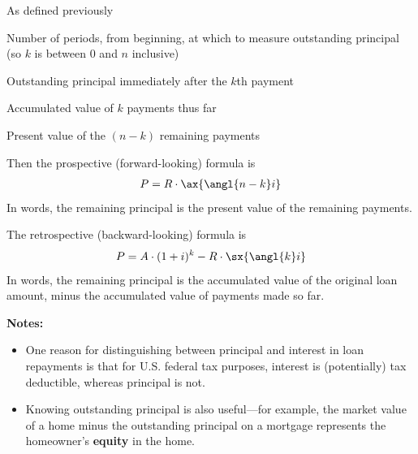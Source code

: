 \documentclass[14pt,twoside]{extarticle}
\begin{document}
\begin{description}[align=right,labelwidth=3.5cm,leftmargin=!,font=\bfseries]
  \item[n, R, i, A] As defined previously
  \item[k] Number of periods, from beginning, at which to measure outstanding principal (so $k$ is between 0 and $n$ inclusive)
  \item[P] Outstanding principal immediately after the $k$th payment
  \item[$R \cdot \mathbf{\sx{\angl{k} i}}$] Accumulated value of $k$ payments thus far
  \item[$R \cdot \mathbf{\ax{\angl{n-k} i}}$] Present value of the $(n-k)$ remaining payments
\end{description}

\pagebreak

Then the prospective (forward-looking) formula is
\begin{align*}
  P & = R \cdot \ax{ \angl{n-k} i} \\
\end{align*}
In words, the remaining principal is the present value of the remaining payments.

The retrospective (backward-looking) formula is
\begin{align*}
  P & = A \cdot (1+i)^k - R \cdot \sx{ \angl{k} i} \\
\end{align*}
In words, the remaining principal is the accumulated value of the original loan
amount, minus the accumulated value of payments made so far.

\vspace{.2in}
\textbf{Notes:}

\begin{itemize}
  \item One reason for distinguishing between principal and interest in loan repayments is that for U.S.
        federal tax purposes, interest is (potentially) tax deductible, whereas principal is not.
  \item Knowing outstanding principal is also useful---for example, the market value of a home minus the
        outstanding principal on a mortgage represents the homeowner's \textbf{equity} in the home.
\end{itemize}
\end{document}
